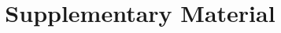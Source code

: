 \documentclass[preprint,12pt]{elsarticle}
\begin{document}
\begin{frontmatter}



\title{Supplementary Material}

\end{frontmatter}


\end{document}
